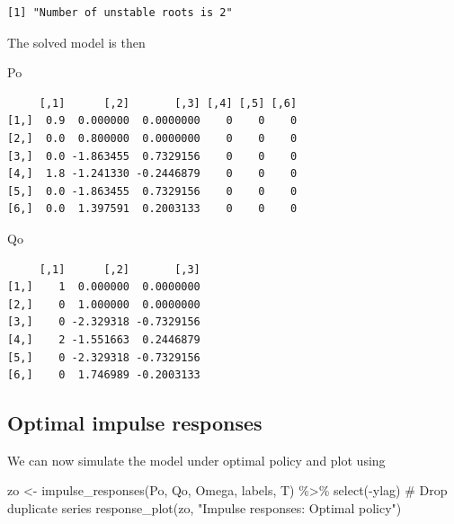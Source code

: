 \documentclass[
  letterpaper,
]{book}
\newenvironment{Shaded}{\begin{snugshade}}{\end{snugshade}}
\newcommand{\CommentTok}[1]{\textcolor[rgb]{0.37,0.37,0.37}{#1}}
\newcommand{\FunctionTok}[1]{\textcolor[rgb]{0.28,0.35,0.67}{#1}}
\newcommand{\NormalTok}[1]{\textcolor[rgb]{0.00,0.23,0.31}{#1}}
\newcommand{\OtherTok}[1]{\textcolor[rgb]{0.00,0.23,0.31}{#1}}
\newcommand{\SpecialCharTok}[1]{\textcolor[rgb]{0.37,0.37,0.37}{#1}}
\newcommand{\StringTok}[1]{\textcolor[rgb]{0.13,0.47,0.30}{#1}}
\begin{document}
\begin{verbatim}
[1] "Number of unstable roots is 2"
\end{verbatim}

\begin{Shaded}
\end{Shaded}

The solved model is then

\begin{Shaded}
\begin{Highlighting}[]
\NormalTok{Po}
\end{Highlighting}
\end{Shaded}

\begin{verbatim}
     [,1]      [,2]       [,3] [,4] [,5] [,6]
[1,]  0.9  0.000000  0.0000000    0    0    0
[2,]  0.0  0.800000  0.0000000    0    0    0
[3,]  0.0 -1.863455  0.7329156    0    0    0
[4,]  1.8 -1.241330 -0.2446879    0    0    0
[5,]  0.0 -1.863455  0.7329156    0    0    0
[6,]  0.0  1.397591  0.2003133    0    0    0
\end{verbatim}

\begin{Shaded}
\begin{Highlighting}[]
\NormalTok{Qo}
\end{Highlighting}
\end{Shaded}

\begin{verbatim}
     [,1]      [,2]       [,3]
[1,]    1  0.000000  0.0000000
[2,]    0  1.000000  0.0000000
[3,]    0 -2.329318 -0.7329156
[4,]    2 -1.551663  0.2446879
[5,]    0 -2.329318 -0.7329156
[6,]    0  1.746989 -0.2003133
\end{verbatim}

\hypertarget{optimal-impulse-responses}{%
\subsection{Optimal impulse responses}\label{optimal-impulse-responses}}

We can now simulate the model under optimal policy and plot using

\begin{Shaded}
\begin{Highlighting}[]
\NormalTok{zo }\OtherTok{\textless{}{-}} \FunctionTok{impulse\_responses}\NormalTok{(Po, Qo, Omega, labels, T) }\SpecialCharTok{\%\textgreater{}\%}
  \FunctionTok{select}\NormalTok{(}\SpecialCharTok{{-}}\NormalTok{ylag) }\CommentTok{\# Drop duplicate series}
\FunctionTok{response\_plot}\NormalTok{(zo, }\StringTok{"Impulse responses: Optimal policy"}\NormalTok{)}
\end{Highlighting}
\end{Shaded}
\end{document}
